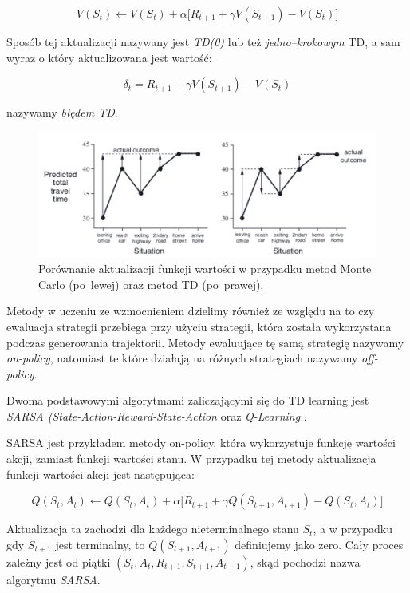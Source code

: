\documentclass[licencjacka]{pracamgr}
\begin{document}
$$ V(S_t) \leftarrow V(S_t) + \alpha \big[R_{t+1} + \gamma V(S_{t+1}) - V(S_t) \big] $$

Sposób tej aktualizacji nazywany jest \emph{TD(0)} lub też \emph{jedno--krokowym} TD, a sam wyraz o który aktualizowana jest wartość:

$$ \delta_t = R_{t+1} + \gamma V(S_{t+1}) - V(S_t) $$

nazywamy \emph{błędem TD}.

\begin{figure}[ht]
  \centering
  \includegraphics[width=1.0\textwidth]{mc_td}
  \caption{Porównanie aktualizacji funkcji wartości w przypadku metod Monte Carlo (po~lewej) oraz metod TD (po~prawej). \cite{Sutton}}
\end{figure}

Metody w uczeniu ze wzmocnieniem dzielimy również ze względu na to czy ewaluacja strategii przebiega przy użyciu strategii, która została wykorzystana podczas generowania trajektorii. Metody ewaluujące tę samą strategię nazywamy \emph{on-policy}, natomiast te które działają na różnych strategiach nazywamy \emph{off-policy}.

Dwoma podstawowymi algorytmami zaliczającymi się do TD learning jest \emph{SARSA (State-Action-Reward-State-Action} \cite{SARSA} oraz \emph{Q-Learning} \cite{Q-learning}.

SARSA jest przykładem metody on-policy, która wykorzystuje funkcję wartości akcji, zamiast funkcji wartości stanu. W przypadku tej metody aktualizacja funkcji wartości akcji jest następująca:

$$ Q(S_t, A_t) \leftarrow Q(S_t, A_t) + \alpha \big[R_{t+1} + \gamma Q(S_{t+1}, A_{t+1}) - Q(S_t, A_t) \big] $$

Aktualizacja ta zachodzi dla każdego nieterminalnego stanu $S_t$, a w przypadku gdy $S_{t+1}$ jest terminalny, to $ Q(S_{t+1}, A_{t+1}) $ definiujemy jako zero. Cały proces zależny jest od piątki $ (S_t, A_t, R_{t+1}, S_{t+1}, A_{t+1}) $, skąd pochodzi nazwa algorytmu \emph{SARSA}.
\end{document}
